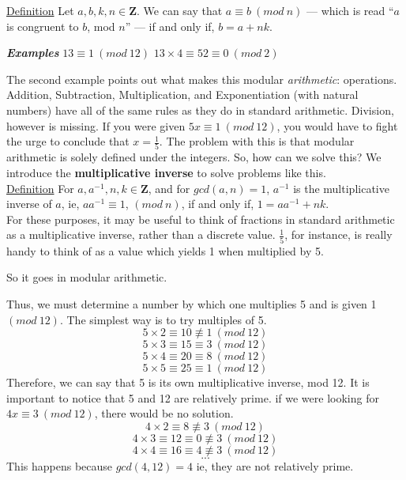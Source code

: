 \documentclass{article}
\begin{document}
	        \noindent\underline{Definition} Let $a,b,k,n\in\mathbf{Z}$.  
	        We can say that $a\equiv b\ (mod\ n)$ --- which is read ``$a$ is congruent to $b$, mod $n$'' --- if and only if, $b=a+nk$.  
	        
	        \textbf{\textit{Examples}}
	        \hspace*{\fill}
		        {$13\equiv 1\ (mod\ 12)$} \hfill {$13\times4\equiv 52\equiv 0\ (mod\ 2)$}
	        \hspace*{\fill}
	        
	        The second example points out what makes this modular \textit{arithmetic}: operations.  Addition, Subtraction, Multiplication, and Exponentiation (with natural numbers) have all of the same rules as they do in standard arithmetic.  
	        Division, however is missing.  If you were given $5x\equiv 1\ (mod\ 12)$, you would have to fight the urge to conclude that $x=\frac{1}{5}$.  
	        The problem with this is that modular arithmetic is solely defined under the integers.  
	        So, how can we solve this?  We introduce the \textbf{multiplicative inverse} to solve problems like this.\\
	        \underline{Definition} For $a, a^{-1}, n, k \in\mathbf{Z}$, and for $gcd(a,n)=1$, $a^{-1}$ is the multiplicative inverse of $a$, ie, $aa^{-1}\equiv1$, $(mod\ n)$, if and only if, $1=aa^{-1}+nk$.\\
	        For these purposes, it may be useful to think of fractions in standard arithmetic as a multiplicative inverse, rather than a discrete value.  
	        $\frac{1}{5}$, for instance, is really handy to think of as a value which yields 1 when multiplied by 5.  
	        
	        So it goes in modular arithmetic.  
	        
	        Thus, we must determine a number by which one multiplies 5 and is given 1 $(mod\ 12)$.
	        The simplest way is to try multiples of 5.
	        $$5\times 2\equiv 10\not \equiv 1\ (mod\ 12)$$
	        $$5\times 3\equiv 15\equiv 3\ (mod\ 12)$$
	        $$5\times 4\equiv 20\equiv 8\ (mod\ 12)$$
	        $$5\times 5\equiv 25\equiv 1\ (mod\ 12)$$
	        Therefore, we can say that 5 is its own multiplicative inverse, mod 12.  
	        It is important to notice that 5 and 12 are relatively prime.  
	        if we were looking for $4x\equiv 3\ (mod\ 12)$, there would be no solution.
	        $$4\times2 \equiv 8 \not\equiv 3\ (mod\ 12)$$
	        $$4\times3 \equiv12 \equiv0 \not\equiv 3\ (mod\ 12)$$
	        $$4\times4 \equiv 16 \equiv4 \not\equiv 3\ (mod\ 12)$$
	        $$...$$
	        This happens because $gcd(4,12)=4$ ie, they are not relatively prime.
	        
\end{document}
